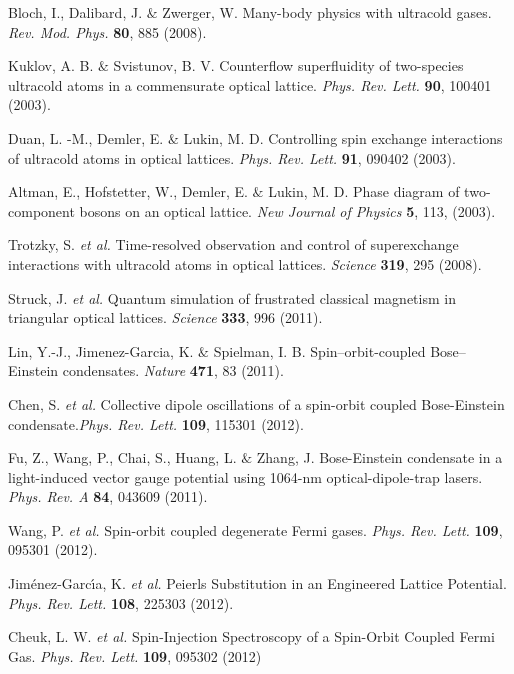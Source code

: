 \documentclass[a4paper,showpacs]{revtex4}
\begin{document}
\begin{thebibliography}{99}
 Bloch, I., Dalibard, J. $\&$ Zwerger, W. Many-body physics with ultracold gases. \textit{Rev. Mod. Phys.} \textbf{80}, 885 (2008).

 Kuklov, A. B. $\&$ Svistunov, B. V.  Counterflow superfluidity of two-species ultracold atoms in a commensurate optical lattice. \textit{Phys. Rev. Lett.} \textbf{90}, 100401 (2003).

 Duan, L. -M., Demler, E. $\&$ Lukin, M. D. Controlling spin exchange interactions of ultracold atoms in optical lattices. \textit{Phys. Rev. Lett.} \textbf{91}, 090402 (2003).

 Altman, E., Hofstetter, W., Demler, E. $\&$ Lukin, M. D. Phase diagram of two-component bosons on an optical lattice. \textit{New Journal of Physics} \textbf{5}, 113, (2003).

 Trotzky, S. \emph{et al.} Time-resolved observation and control of superexchange interactions with ultracold atoms in optical lattices. \textit{Science} \textbf{319}, 295 (2008).

 Struck, J. \emph{et al.} Quantum simulation of frustrated classical magnetism in triangular optical lattices. \textit{Science} \textbf{333}, 996 (2011).

  Lin, Y.-J., Jimenez-Garcia, K. $\&$ Spielman, I. B. Spin–orbit-coupled Bose–Einstein condensates. \textit{Nature} \textbf{471}, 83 (2011).

 Chen, S. \emph{et al.} Collective dipole oscillations of a spin-orbit coupled Bose-Einstein condensate.\textit{Phys. Rev. Lett.} \textbf{109}, 115301 (2012).

 Fu, Z., Wang, P., Chai, S., Huang, L. $\&$ Zhang, J. Bose-Einstein condensate in a light-induced vector gauge potential using 1064-nm optical-dipole-trap lasers. \textit{Phys. Rev. A} \textbf{84}, 043609 (2011).

 Wang, P. \emph{et al.} Spin-orbit coupled degenerate Fermi gases. \textit{Phys. Rev. Lett.} \textbf{109}, 095301 (2012).

 Jim\'{e}nez-Garc\'{\i}a, K. \emph{et al.} Peierls Substitution in an Engineered Lattice Potential. \textit{Phys. Rev. Lett.} \textbf{108}, 225303 (2012).

  Cheuk, L. W. \emph{et al.} Spin-Injection Spectroscopy of a Spin-Orbit Coupled Fermi Gas. \textit{Phys. Rev. Lett.} \textbf{109}, 095302 (2012)


\end{thebibliography}
\end{document}
